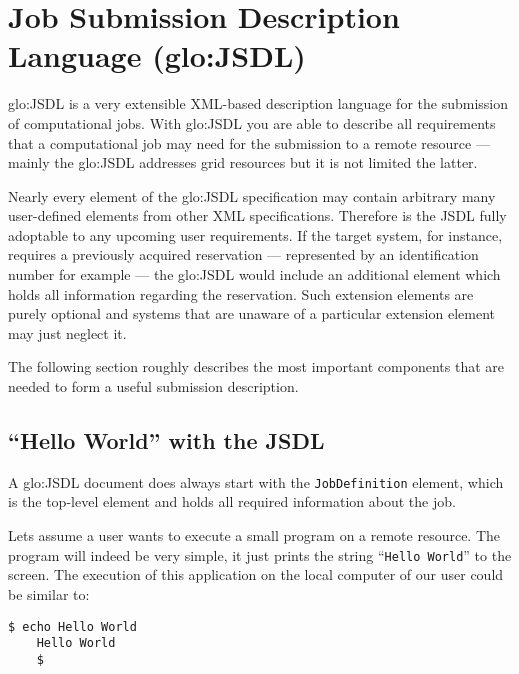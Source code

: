 \section[Job Submission Description Language]
{Job Submission Description Language (\gls{glo:JSDL})}

\gls{glo:JSDL} is a very extensible XML-based description language for the
submission  of computational jobs.   With \gls{glo:JSDL}  you are  able to
describe  all requirements  that  a  computational job  may  need for  the
submission to  a remote resource  --- mainly the  \gls{glo:JSDL} addresses
grid resources but it is not limited the latter.

Nearly  every  element of  the  \gls{glo:JSDL}  specification may  contain
arbitrary  many  user-defined  elements  from  other  XML  specifications.
Therefore is the  JSDL fully adoptable to any  upcoming user requirements.
If  the  target  system,  for  instance, requires  a  previously  acquired
reservation ---  represented by an  identification number for  example ---
the  \gls{glo:JSDL} would include  an additional  element which  holds all
information regarding the reservation.  Such extension elements are purely
optional and  systems that are  unaware of a particular  extension element
may just neglect it.

The following section roughly describes the most important components that
are needed to form a useful submission description.

\subsection{``Hello World'' with the JSDL}

A    \gls{glo:JSDL}    document     does    always    start    with    the
\texttt{JobDefinition} element,  which is the top-level  element and holds
all required information about the job.

Lets assume a user wants to  execute a small program on a remote resource.
The  program  will  indeed be  very  simple,  it  just prints  the  string
``\texttt{Hello World}'' to the  screen. The execution of this application
on the local computer of our user could be similar to:

\begin{minipage}{0.75\textwidth}
  \begin{lstlisting}[language=ksh]
    $ echo Hello World
    Hello World
    $
  \end{lstlisting}
\end{minipage}

